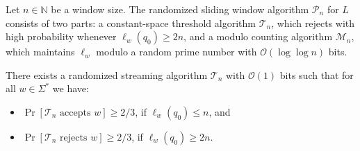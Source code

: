 \documentclass{article}\usepackage[a4paper,margin=20mm]{geometry}
\newcommand{\N}{\mathbb{N}}
\newcommand{\M}{\mathcal{M}}
\renewcommand{\O}{\mathcal{O}}
\renewcommand{\P}{\mathcal{P}}
\renewcommand{\geq}{\geqslant}
\renewcommand{\leq}{\leqslant}
\renewcommand{\ge}{\geq}
\renewcommand{\le}{\leq}
\begin{document}
Let $n \in \N$ be a window size.
The randomized sliding window algorithm $\P_n$ for $L$ consists of two parts:
a constant-space threshold algorithm $\mathcal{T}_n$,
which rejects with high probability whenever $\ell_{w}(q_0) \geq 2n$,
and a modulo counting algorithm $\M_n$, which maintains $\ell_w$ modulo a random prime number
with $\O(\log \log n)$ bits.

\begin{lemma} \label{lemma-threshold}
	There exists a randomized streaming algorithm $\mathcal{T}_n$ with $\O(1)$ bits
	such that for all $w \in \Sigma^*$ we have:
	\begin{itemize}
		\item $\Pr[\mathcal{T}_n \text{ accepts } w] \ge 2/3$, if $\ell_w(q_0) \le n$, and
		\item $\Pr[\mathcal{T}_n \text{ rejects } w] \ge 2/3$, if $\ell_w(q_0) \ge 2n$.
	\end{itemize}
\end{lemma}
\end{document}
